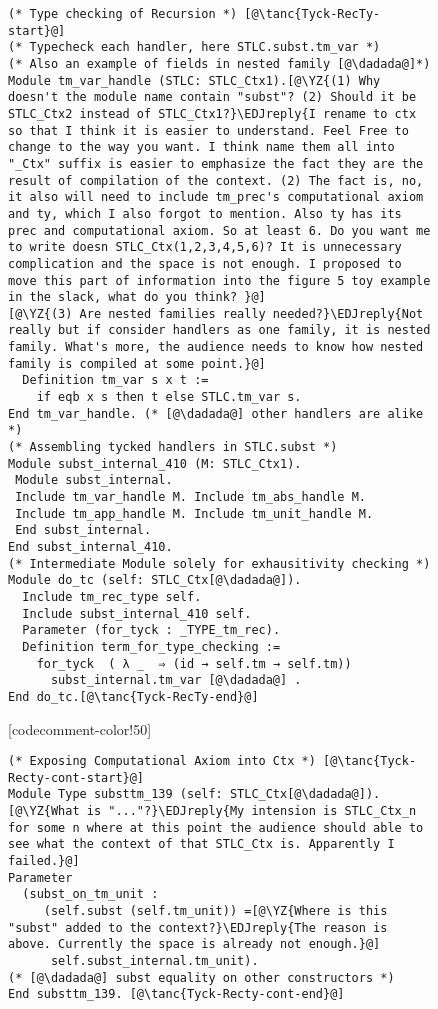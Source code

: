 \begin{figure}
\begin{minipage}{\textwidth}
\begin{multicols}{2}
\begin{lstlisting}
(* Type checking of Recursion *) [@\tanc{Tyck-RecTy-start}@]
(* Typecheck each handler, here STLC.subst.tm_var *)
(* Also an example of fields in nested family [@\dadada@]*) 
Module tm_var_handle (STLC: STLC_Ctx1).[@\YZ{(1) Why doesn't the module name contain "subst"? (2) Should it be STLC_Ctx2 instead of STLC_Ctx1?}\EDJreply{I rename to ctx so that I think it is easier to understand. Feel Free to change to the way you want. I think name them all into "_Ctx" suffix is easier to emphasize the fact they are the result of compilation of the context. (2) The fact is, no, it also will need to include tm_prec's computational axiom and ty, which I also forgot to mention. Also ty has its prec and computational axiom. So at least 6. Do you want me to write doesn STLC_Ctx(1,2,3,4,5,6)? It is unnecessary complication and the space is not enough. I proposed to move this part of information into the figure 5 toy example in the slack, what do you think? }@]
[@\YZ{(3) Are nested families really needed?}\EDJreply{Not really but if consider handlers as one family, it is nested family. What's more, the audience needs to know how nested family is compiled at some point.}@]
  Definition tm_var s x t := 
    if eqb x s then t else STLC.tm_var s.
End tm_var_handle. (* [@\dadada@] other handlers are alike *)
(* Assembling tycked handlers in STLC.subst *)
Module subst_internal_410 (M: STLC_Ctx1). 
 Module subst_internal.
 Include tm_var_handle M. Include tm_abs_handle M.
 Include tm_app_handle M. Include tm_unit_handle M.
 End subst_internal.
End subst_internal_410.
(* Intermediate Module solely for exhausitivity checking *) 
Module do_tc (self: STLC_Ctx[@\dadada@]).
  Include tm_rec_type self. 
  Include subst_internal_410 self.
  Parameter (for_tyck : _TYPE_tm_rec).
  Definition term_for_type_checking :=
    for_tyck  ( λ _  ⇒ (id → self.tm → self.tm))
      subst_internal.tm_var [@\dadada@] .
End do_tc.[@\tanc{Tyck-RecTy-end}@]
\end{lstlisting}

[codecomment-color!50]

\columnbreak



\begin{lstlisting}
(* Exposing Computational Axiom into Ctx *) [@\tanc{Tyck-Recty-cont-start}@]
Module Type substtm_139 (self: STLC_Ctx[@\dadada@]).[@\YZ{What is "..."?}\EDJreply{My intension is STLC_Ctx_n for some n where at this point the audience should able to see what the context of that STLC_Ctx is. Apparently I failed.}@]
Parameter
  (subst_on_tm_unit :
	 (self.subst (self.tm_unit)) =[@\YZ{Where is this "subst" added to the context?}\EDJreply{The reason is above. Currently the space is already not enough.}@]
      self.subst_internal.tm_unit).
(* [@\dadada@] subst equality on other constructors *)
End substtm_139. [@\tanc{Tyck-Recty-cont-end}@]
\end{lstlisting}




\end{multicols}
\end{minipage}
\end{figure}
